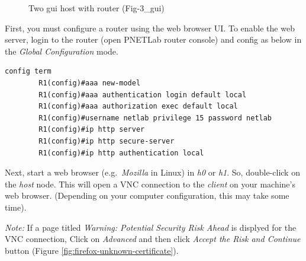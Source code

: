 \documentclass{UTNetLab}
\begin{document}
    \begin{figure}[H]
        \centering
        \caption{Two gui host with router (Fig-3\_gui)}
        \label{fig:two-gui}
    \end{figure}
    First, you must configure a router using the web browser UI. To enable the web server, login to the router  (open PNETLab router console) and config as below  in the \textit{Global Configuration} mode. 
    
\begin{lstlisting}[frame=trBL, language={cisco}]
	config term
		R1(config)#aaa new-model                                
		R1(config)#aaa authentication login default local      
		R1(config)#aaa authorization exec default local         
		R1(config)#username netlab privilege 15 password netlab
		R1(config)#ip http server                               
		R1(config)#ip http secure-server                        
		R1(config)#ip http authentication local  
\end{lstlisting} 


    Next, start a web browser (e.g.\ \textit{Mozilla} in Linux) in \textit{h0} or \textit{h1}. So, double-click on the \textit{host} node. This will open a VNC connection to the \textit{client} on your machine's web browser. (Depending on your computer configuration, this may take some time).
    
    \textit{Note:} If a page titled \textit{Warning: Potential Security Risk Ahead} is displyed for the VNC connection, Click on \textit{Advanced} and then click \textit{Accept the Risk and Continue} button (Figure \ref{fig:firefox-unknown-certificate}).    
    
\end{document}
